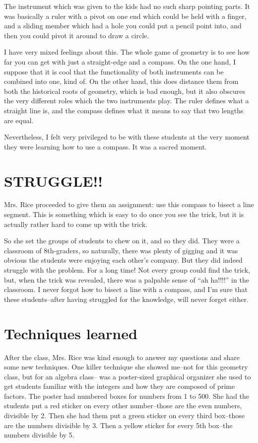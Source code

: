 \documentclass[11pt]{elegantbook}
\begin{document}
The instrument which was given to the kids had no such sharp pointing
parts.  It was basically a ruler with a pivot on one end which could
be held with a finger, and a sliding member which had a hole you could
put a pencil point into, and then you could pivot it around to draw a
circle.

I have very mixed feelings about this.  The whole game of geometry is
to see how far you can get with just a straight-edge and a compass.
On the one hand, I suppose that it is cool that the functionality of
both instruments can be combined into one, kind of.  On the other hand,
this does distance them from both the historical roots of geometry,
which is bad enough, but it also obscures the very different roles
which the two instruments play.   The ruler defines what a straight line
is, and the compass defines what it means to say that two lengths are
equal.

Nevertheless, I felt very privileged to be with these students at the
very moment they were learning how to use a compass.  It was a sacred
moment.

\section*{STRUGGLE!!}

Mrs. Rice proceeded to give them an assignment: use this compass to
bisect a line segment.  This is something which is easy to do once you
see the trick, but it is actually rather hard to come up with the
trick.

So she set the groups of students to chew on it, and so they did.
They were a classroom of 8th-graders, so naturally, there was plenty
of gigging and it was obvious the students were enjoying each other's
company.  But they did indeed struggle with the problem.  For a long
time!  Not every group could find the trick, but, when the trick was
revealed, there was a palpable sense of ``ah ha!!!!'' in the
classroom.  I never forgot how to bisect a line with a compass, and
I'm sure that these students--after having struggled for the
knowledge, will never forget either.

\section*{Techniques learned}

After the class, Mrs. Rice was kind enough to answer my questions and
share some new techniques.  One killer technique she showed me--not
for this geometry class, but for an algebra class-- was a poster-sized
graphical organizer she used to get students familiar with the
integers and how they are composed of prime factors.  The poster had
numbered boxes for numbers from 1 to 500.  She had the students put a
red sticker on every other number--those are the even numbers,
divisible by 2.  Then she had them put a green sticker on every third
box--those are the numbers divisible by 3.  Then a yellow sticker for
every 5th box--the numbers divisible by 5.
\end{document}
